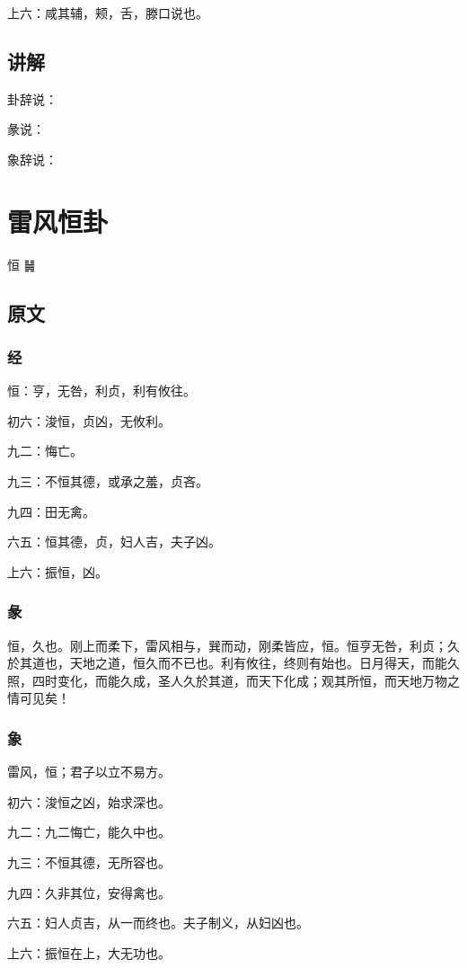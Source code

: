 \documentclass[12pt,oneside]{book}
\begin{document}
上六：咸其辅，颊，舌，滕口说也。

\section{讲解}
卦辞说：

彖说：

象辞说：

\chapter{雷风恒卦}
恒 {\Large ䷟}

\section{原文}

\subsection{经}
恒：亨，无咎，利贞，利有攸往。

初六：浚恒，贞凶，无攸利。

九二：悔亡。

九三：不恒其德，或承之羞，贞吝。

九四：田无禽。

六五：恒其德，贞，妇人吉，夫子凶。

上六：振恒，凶。

\subsection{彖}
恒，久也。刚上而柔下，雷风相与，巽而动，刚柔皆应，恒。恒亨无咎，利贞；久於其道也，天地之道，恒久而不已也。利有攸往，终则有始也。日月得天，而能久照，四时变化，而能久成，圣人久於其道，而天下化成；观其所恒，而天地万物之情可见矣！

\subsection{象}
雷风，恒；君子以立不易方。

初六：浚恒之凶，始求深也。

九二：九二悔亡，能久中也。

九三：不恒其德，无所容也。

九四：久非其位，安得禽也。

六五：妇人贞吉，从一而终也。夫子制义，从妇凶也。

上六：振恒在上，大无功也。
\end{document}
